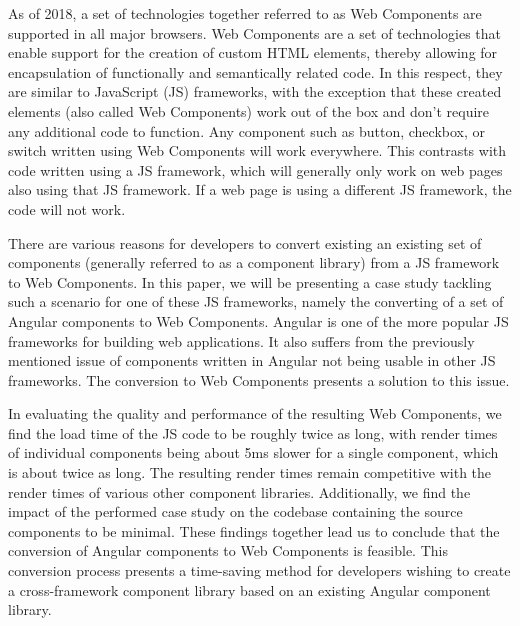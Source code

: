 As of 2018, a set of technologies together referred to as Web Components are supported in all major browsers. Web Components are a set of technologies that enable support for the creation of custom HTML elements, thereby allowing for encapsulation of functionally and semantically related code. In this respect, they are similar to JavaScript (JS) frameworks, with the exception that these created elements (also called Web Components) work out of the box and don't require any additional code to function. Any component such as button, checkbox, or switch written using Web Components will work everywhere. This contrasts with code written using a JS framework, which will generally only work on web pages also using that JS framework. If a web page is using a different JS framework, the code will not work. 

There are various reasons for developers to convert existing an existing set of components (generally referred to as a component library) from a JS framework to Web Components. In this paper, we will be presenting a case study tackling such a scenario for one of these JS frameworks, namely the converting of a set of Angular components to Web Components. Angular is one of the more popular JS frameworks for building web applications. It also suffers from the previously mentioned issue of components written in Angular not being usable in other JS frameworks. The conversion to Web Components presents a solution to this issue.

In evaluating the quality and performance of the resulting Web Components, we find the load time of the JS code to be roughly twice as long, with render times of individual components being about 5ms slower for a single component, which is about twice as long. The resulting render times remain competitive with the render times of various other component libraries. Additionally, we find the impact of the performed case study on the codebase containing the source components to be minimal. These findings together lead us to conclude that the conversion of Angular components to Web Components is feasible. This conversion process presents a time-saving method for developers wishing to create a cross-framework component library based on an existing Angular component library.
